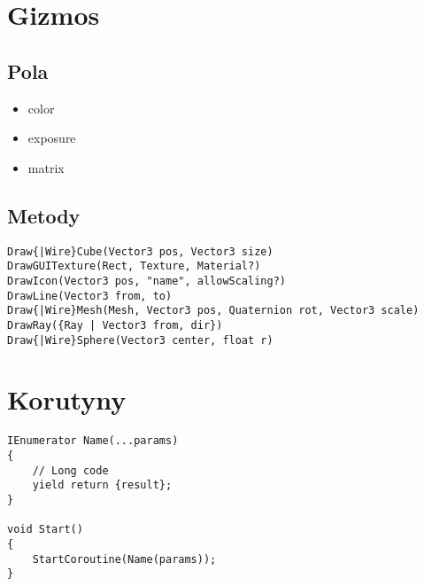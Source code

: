 \documentclass{article}
\begin{document}
\section{Gizmos}
\subsection{Pola}
\begin{itemize}
    \item color
    \item exposure
    \item matrix
\end{itemize}

\subsection{Metody}
\begin{lstlisting}
Draw{|Wire}Cube(Vector3 pos, Vector3 size)
DrawGUITexture(Rect, Texture, Material?)
DrawIcon(Vector3 pos, "name", allowScaling?)
DrawLine(Vector3 from, to)
Draw{|Wire}Mesh(Mesh, Vector3 pos, Quaternion rot, Vector3 scale)
DrawRay({Ray | Vector3 from, dir})
Draw{|Wire}Sphere(Vector3 center, float r)
\end{lstlisting}

\section{Korutyny}
\begin{lstlisting}
IEnumerator Name(...params)
{
    // Long code
    yield return {result};
}

void Start()
{
    StartCoroutine(Name(params));
}
\end{lstlisting}
\end{document}
